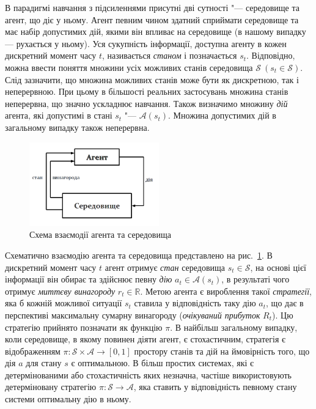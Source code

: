 \documentclass[a4paper,10pt,fleqn]{article}
\begin{document}
В парадигмі навчання з підсиленнями присутні дві сутності "--- середовище та агент, що діє у ньому. Агент певним чином здатний сприймати середовище та має набір допустимих дій, якими він впливає на середовище (в нашому випадку --- рухається у ньому). Уся сукупність інформації, доступна агенту в кожен дискретний момент часу $t$, називається \emph{станом} і позначається $s_t$. Відповідно, можна ввести поняття множини усіх можливих станів середовища $\mathcal{S}\ (s_t \in \mathcal{S})$. Слід зазначити, що множина можливих станів може бути як дискретною, так і неперервною. При цьому в більшості реальних застосувань множина станів неперервна, що значно ускладнює навчання. Також визначимо множину \emph{дій} агента, які допустимі в стані $s_t$ "--- $\mathcal{A}(s_t)$. Множина допустимих дій в загальному випадку також неперервна.

\begin{figure}
\centering
\includegraphics[width=0.5\textwidth]{agent-env-diagram.png}
\caption{Схема взаємодії агента та середовища}
\label{fig:agent-env-diagram}
\end{figure}

Схематично взаємодію агента та середовища представлено на рис.~\ref{fig:agent-env-diagram}. В дискретний момент часу $t$ агент отримує \emph{стан} середовища $s_t \in \mathcal{S}$, на основі цієї інформації він обирає та здійснює певну \emph{дію} $a_t \in \mathcal{A}(s_t)$, в результаті чого отримує \emph{миттєву винагороду} $r_t \in \mathbb{R}$. Метою агента є вироблення такої \emph{стратегії}, яка б кожній можливої ситуації $s_t$ ставила у відповідність таку дію $a_t$, що дає в перспективі максимальну сумарну винагороду (\emph{очікуваний прибуток} $R_t$). Цю стратегію прийнято позначати як функцію $\pi$. В найбільш загальному випадку, коли середовище, в якому повинен діяти агент, є стохастичним, стратегія є відображенням  $\pi:\mathcal{S}\times\mathcal{A} \rightarrow [0,1]$ простору станів та дій на ймовірність того, що дія $a$ для стану $s$ є оптимальною. В більш простих системах, які є детермінованими або стохастичність яких незначна, частіше використовують детерміновану стратегію $\pi:\mathcal{S} \rightarrow \mathcal{A}$, яка ставить у відповідність певному стану системи оптимальну дію в ньому.
\end{document}
